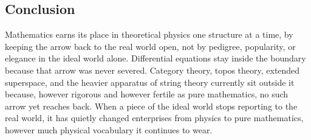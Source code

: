 \subsection{Conclusion}

Mathematics earns its place in theoretical physics one structure at a time, by
keeping the arrow back to the real world open, not by pedigree, popularity, or
elegance in the ideal world alone. Differential equations stay inside the
boundary because that arrow was never severed. Category theory, topos theory,
extended superspace, and the heavier apparatus of string theory currently sit
outside it because, however rigorous and however fertile as pure mathematics,
no such arrow yet reaches back. When a piece of the ideal world stops reporting
to the real world, it has quietly changed enterprises from physics to pure
mathematics, however much physical vocabulary it continues to wear.

